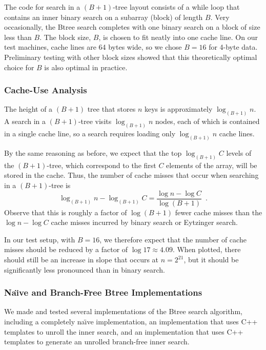 \documentclass{patmorin}
\begin{document}
The code for search in a $(B+1)$-tree layout consists of a while loop
that contains an inner binary search on a subarray (block) of length
$B$. Very occasionally, the Btree search completes with one binary search
on a block of size less than $B$. The block size, $B$, is chosen to fit
neatly into one cache line. On our test machines, cache lines are 64
bytes wide, so we chose $B=16$ for 4-byte data. Preliminary testing with
other block sizes showed that this theoretically optimal choice for $B$
is also optimal in practice.

\subsubsection{Cache-Use Analysis}

The height of a $(B+1)$ tree that stores $n$ keys is approximately
$\log_{(B+1)} n$.  A search in a $(B+1)$-tree visits $\log_{(B+1)} n$
nodes, each of which is contained in a single cache line, so a search
requires loading only $\log_{(B+1)} n$ cache lines.

By the same reasoning as before, we expect that the top $\log_{(B+1)} C$
levels of the $(B+1)$-tree, which correspond to the first $C$ elements
of the array, will be stored in the cache.  Thus, the number of cache
misses that occur when searching in a $(B+1)$-tree is
\[
    \log_{(B+1)}n - \log_{(B+1)} C 
         = \frac{\log n - \log C}{\log (B+1)} \enspace .
\]
Observe that this is roughly a factor of $\log(B+1)$ fewer cache misses
than the $\log n-\log C$ cache misses incurred by binary search or
Eytzinger search.

In our test setup, with $B=16$, we therefore expect that the number
of cache misses should be reduced by a factor of $\log 17\approx
4.09$. When plotted, there should still be an increase in slope that
occurs at $n=2^{21}$, but it should be significantly less pronounced
than in binary search.

\subsubsection{Na\"{\i}ve and Branch-Free Btree Implementations}

We made and tested several implementations of the Btree search algorithm,
including a completely na\"{\i}ve implementation, an implementation that
uses C++ templates to unroll the inner search, and an implementation
that uses C++ templates to generate an unrolled branch-free inner search.
\end{document}

